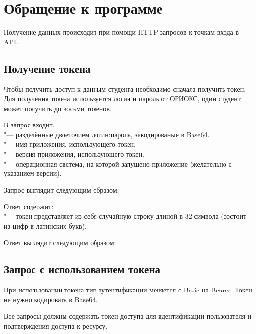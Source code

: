 \chapter{Обращение к программе}
\label{ch:usage}

Получение данных происходит при помощи HTTP запросов к точкам входа в API\@.

\section{Получение токена}
\label{sec:token}
Чтобы получить доступ к данным студента необходимо сначала получить токен.
Для получения токена используется логин и пароль от ОРИОКС, один студент может получить до восьми токенов.

В запрос входит:\\
 "--- разделённые двоеточием логин:пароль, закодированые в Base64.\\
 "--- имя приложения, использующего токен.\\
 "--- версия приложения, использующего токен.\\
 "--- операционная система, на которой запущено приложение (желательно с указанием версии).

Запрос выглядит следующим образом:
\begin{listing}[H]
\end{listing}
\vspace{-0.75cm}

Ответ содержит:\\
 "--- токен представляет из себя случайную строку длиной в 32 символа (состоит из цифр и латинских букв).

Ответ выглядит следующим образом:
\begin{listing}[H]
\end{listing}
\vspace{-0.75cm}

\section{Запрос с использованием токена}
\label{sec:request}
При использовании токена тип аутентификации меняется с Basic на Bearer.
Токен не нужно кодировать в Base64.

\begin{listing}[H]
\end{listing}
\vspace{-0.75cm}

Все запросы должны содержать токен доступа для идентификации пользователя и подтверждения доступа к ресурсу.
